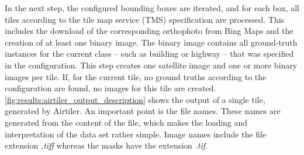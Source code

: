 In the next step, the configured bounding boxes are iterated, and for each box, all tiles according to the tile map service (TMS) specification \cite{tmsspec} are processed. This includes the download of the corresponding orthophoto from Bing Maps and the creation of at least one binary image. The binary image contains all ground-truth instances for the current class – such as building or highway – that was specified in the configuration. This step creates one satellite image and one or more binary images per tile. If, for the current tile, no ground truths according to the configuration are found, no images for this tile are created. \autoref{fig:results:airtiler_output_description} shows the output of a single tile, generated by Airtiler. An important point is the file names. These names are generated from the content of the file, which makes the loading and interpretation of the data set rather simple. Image names include the file extension \textit{.tiff} whereas the masks have the extension \textit{.tif}.

